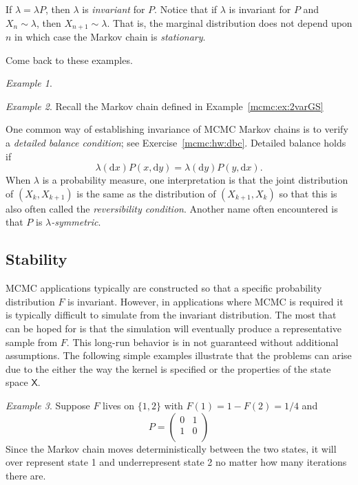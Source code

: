 \documentclass[12pt]{article}
\theoremstyle{plain}
\theoremstyle{definition}
\theoremstyle{remark}
\newtheorem{example}{Example}[section]
\newcommand{\df}{\mathrm{d}}
\newcommand{\X}{\mathsf{X}}
\begin{document}
If $\lambda = \lambda P$, then $\lambda$ is {\em invariant} for $P$.
Notice that if $\lambda$ is invariant for $P$ and $X_n \sim \lambda$,
then $X_{n+1} \sim \lambda$.  That is, the marginal distribution does
not depend upon $n$ in which case the Markov chain is {\em
  stationary}.

{\color{blue} Come back to these examples.}

\begin{example}
\end{example}

\begin{example}
  Recall the Markov chain defined in Example~\eqref{mcmc:ex:2varGS}
\end{example}


One common way of establishing invariance of MCMC Markov chains is to
verify a {\em detailed balance condition}; see
Exercise~\ref{mcmc:hw:dbc}.  Detailed balance holds if
\begin{equation}
   \label{mcmc:eq:dbc}
   \lambda(\df x) P(x, \df y) = \lambda(\df y) P(y, \df x). 
 \end{equation}
 When $\lambda$ is a probability measure, one interpretation is that
 the joint distribution of $(X_k, X_{k+1})$ is the same as the
 distribution of $(X_{k+1}, X_{k})$ so that this is also often called
 the {\em reversibility condition}.  Another name often encountered is
 that $P$ is {\em $\lambda$-symmetric}.

 \subsection{Stability}
 \label{mcmc:sec:stability}
 MCMC applications typically are constructed so that a specific
 probability distribution $F$ is invariant.  However, in applications
 where MCMC is required it is typically difficult to simulate from the
 invariant distribution.  The most that can be hoped for is that the
 simulation will eventually produce a representative sample from $F$.
 This long-run behavior is in not guaranteed without additional
 assumptions. The following simple examples illustrate that the
 problems can arise due to the either the way the kernel is specified
 or the properties of the state space $\X$.

 \begin{example}
   \label{mcmc:ex:detmc}
   Suppose $F$ lives on $\{ 1, 2\}$ with $F(1) = 1 - F(2) = 1/4$ and
   \[
     P = \begin{pmatrix}
       0 & 1 \\
       1 & 0 \\
       \end{pmatrix}
   \]
   Since the Markov chain moves deterministically between the two
   states, it will over represent state 1 and underrepresent state 2
   no matter how many iterations there are.
 \end{example}
\end{document}
